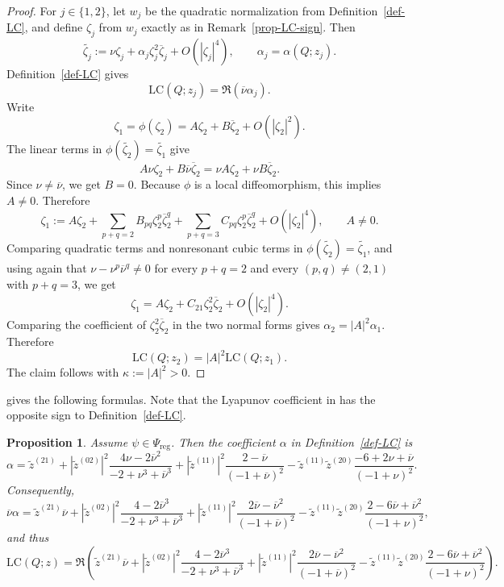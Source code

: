 \documentclass[11pt,a4paper]{article}
\theoremstyle{plain}
\newtheorem{proposition}[theorem]{Proposition}%
\theoremstyle{definition}
\theoremstyle{plain}
\numberwithin{equation}{section}
\begin{document}
\begin{proof}
For $j \in \{1,2\}$, let $w_j$ be the quadratic normalization from Definition~\ref{def-LC}, and define $\zeta_j$ from $w_j$ exactly as in Remark~\ref{prop-LC-sign}. Then
\[
\widetilde{\zeta_j}
:=
\nu \zeta_j + \alpha_j \zeta_j^2 \overline\zeta_j + O(|\zeta_j|^4),
\qquad
\alpha_j = \alpha(Q;z_j).
\]
Definition~\ref{def-LC} gives
\[
\mathrm{LC}(Q;z_j) = \Re(\overline\nu \alpha_j).
\]
Write
\[
\zeta_1 = \phi(\zeta_2)
=
A \zeta_2 + B \overline\zeta_2 + O(|\zeta_2|^2).
\]
The linear terms in $\phi(\widetilde{\zeta_2}) = \widetilde{\zeta_1}$ give
\[
A \nu \zeta_2 + B \overline\nu \overline\zeta_2
=
\nu A \zeta_2 + \nu B \overline\zeta_2.
\]
Since $\nu \neq \overline\nu$, we get $B = 0$. Because $\phi$ is a local diffeomorphism, this implies $A \neq 0$. Therefore
\[
\zeta_1
:=
A \zeta_2
+
\sum_{p+q=2} B_{pq} \zeta_2^p \overline\zeta_2^q
+
\sum_{p+q=3} C_{pq} \zeta_2^p \overline\zeta_2^q
+
O(|\zeta_2|^4),
\qquad
A \neq 0.
\]
Comparing quadratic terms and nonresonant cubic terms in $\phi(\widetilde{\zeta_2}) = \widetilde{\zeta_1}$, and using again that $\nu - \nu^p \overline\nu^q \neq 0$ for every $p+q=2$ and every $(p,q)\neq(2,1)$ with $p+q=3$, we get
\[
\zeta_1 = A \zeta_2 + C_{21}\zeta_2^2 \overline\zeta_2 + O(|\zeta_2|^4).
\]
Comparing the coefficient of $\zeta_2^2 \overline\zeta_2$ in the two normal forms gives $\alpha_2 = |A|^2 \alpha_1$. Therefore
\[
\mathrm{LC}(Q;z_2) = |A|^2 \mathrm{LC}(Q;z_1).
\]
The claim follows with $\kappa := |A|^2 > 0$.
\end{proof}

\cite[Proposition~4.1]{Tomizawa2025} gives the following formulas. Note that the Lyapunov coefficient in \cite{Tomizawa2025} has the opposite sign to Definition~\ref{def-LC}.
\begin{proposition}\label{prop-LCfmla}
Assume $\psi \in \Psi_\mathrm{reg}$. Then the coefficient $\alpha$ in Definition~\ref{def-LC} is
\begin{equation}
\label{eq-alpha}
\alpha
=
\widetilde{z}^{(21)}
+
|\widetilde{z}^{(02)}|^2
\frac{4\nu - 2\overline\nu^2}{-2 + \nu^3 + \overline\nu^3}
+
|\widetilde{z}^{(11)}|^2
\frac{2 - \overline\nu}{(-1 + \overline\nu)^2}
-
\widetilde{z}^{(11)} \widetilde{z}^{(20)}
\frac{-6 + 2\nu + \overline\nu}{(-1 + \nu)^2}.
\end{equation}
Consequently,
\begin{equation}
\label{eq-nubaralpha}
\overline\nu \alpha
=
\widetilde{z}^{(21)} \overline\nu
+
|\widetilde{z}^{(02)}|^2
\frac{4 - 2\overline\nu^3}{-2 + \nu^3 + \overline\nu^3}
+
|\widetilde{z}^{(11)}|^2
\frac{2\overline\nu - \overline\nu^2}{(-1 + \overline\nu)^2}
-
\widetilde{z}^{(11)} \widetilde{z}^{(20)}
\frac{2 - 6\overline\nu + \overline\nu^2}{(-1 + \nu)^2},
\end{equation}
and thus
\[
\mathrm{LC}(Q;z)
=
\Re\left(
\widetilde{z}^{(21)} \overline\nu
+
|\widetilde{z}^{(02)}|^2
\frac{4 - 2\overline\nu^3}{-2 + \nu^3 + \overline\nu^3}
+
|\widetilde{z}^{(11)}|^2
\frac{2\overline\nu - \overline\nu^2}{(-1 + \overline\nu)^2}
-
\widetilde{z}^{(11)} \widetilde{z}^{(20)}
\frac{2 - 6\overline\nu + \overline\nu^2}{(-1 + \nu)^2}
\right).
\]
\end{proposition}
\end{document}
